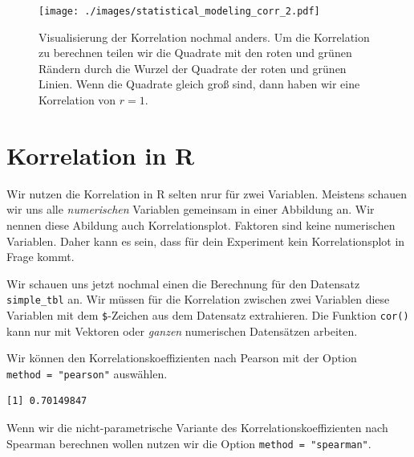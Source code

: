 \documentclass[
  letterpaper,
]{scrbook}
\newenvironment{Shaded}{\begin{snugshade}}{\end{snugshade}}
\newcommand{\AttributeTok}[1]{\textcolor[rgb]{0.40,0.45,0.13}{#1}}
\newcommand{\FunctionTok}[1]{\textcolor[rgb]{0.28,0.35,0.67}{#1}}
\newcommand{\NormalTok}[1]{\textcolor[rgb]{0.00,0.23,0.31}{#1}}
\newcommand{\SpecialCharTok}[1]{\textcolor[rgb]{0.37,0.37,0.37}{#1}}
\newcommand{\StringTok}[1]{\textcolor[rgb]{0.13,0.47,0.30}{#1}}
\begin{document}
\begin{figure}

{\centering \texttt{[image: ./images/statistical\_modeling\_corr\_2.pdf]}

}

\caption{\label{fig-corr2}Visualisierung der Korrelation nochmal anders.
Um die Korrelation zu berechnen teilen wir die Quadrate mit den roten
und grünen Rändern durch die Wurzel der Quadrate der roten und grünen
Linien. Wenn die Quadrate gleich groß sind, dann haben wir eine
Korrelation von \(r = 1.\)}

\end{figure}

\hypertarget{korrelation-in-r}{%
\section{Korrelation in R}\label{korrelation-in-r}}

Wir nutzen die Korrelation in R selten nrur für zwei Variablen. Meistens
schauen wir uns alle \emph{numerischen} Variablen gemeinsam in einer
Abbildung an. Wir nennen diese Abildung auch Korrelationsplot. Faktoren
sind keine numerischen Variablen. Daher kann es sein, dass für dein
Experiment kein Korrelationsplot in Frage kommt.

Wir schauen uns jetzt nochmal einen die Berechnung für den Datensatz
\texttt{simple\_tbl} an. Wir müssen für die Korrelation zwischen zwei
Variablen diese Variablen mit dem \texttt{\$}-Zeichen aus dem Datensatz
extrahieren. Die Funktion \texttt{cor()} kann nur mit Vektoren oder
\emph{ganzen} numerischen Datensätzen arbeiten.

Wir können den Korrelationskoeffizienten nach Pearson mit der Option
\texttt{method\ =\ "pearson"} auswählen.

\begin{Shaded}
\end{Shaded}

\begin{verbatim}
[1] 0.70149847
\end{verbatim}

Wenn wir die nicht-parametrische Variante des Korrelationskoeffizienten
nach Spearman berechnen wollen nutzen wir die Option
\texttt{method\ =\ "spearman"}.
\end{document}

